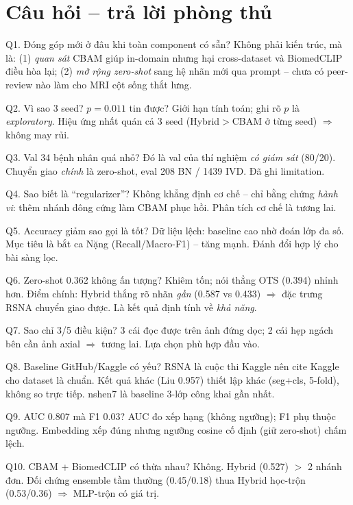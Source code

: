 \documentclass[12pt,a4paper]{article}
\begin{document}
\section{Câu hỏi -- trả lời phòng thủ}
\begin{qabox}{Q1. Đóng góp mới ở đâu khi toàn component có sẵn?}
Không phải kiến trúc, mà là: (1) \emph{quan sát} CBAM giúp in-domain nhưng hại cross-dataset và BiomedCLIP điều hòa lại; (2) \emph{mở rộng zero-shot} sang hệ nhãn mới qua prompt -- chưa có peer-review nào làm cho MRI cột sống thắt lưng.
\end{qabox}
\begin{qabox}{Q2. Vì sao 3 seed? $p=0.011$ tin được?}
Giới hạn tính toán; ghi rõ $p$ là \emph{exploratory}. Hiệu ứng nhất quán cả 3 seed (Hybrid$>$CBAM ở từng seed) $\Rightarrow$ không may rủi.
\end{qabox}
\begin{qabox}{Q3. Val 34 bệnh nhân quá nhỏ?}
Đó là val của thí nghiệm \emph{có giám sát} (80/20). Chuyển giao \emph{chính} là zero-shot, eval 208 BN / 1439 IVD. Đã ghi limitation.
\end{qabox}
\begin{qabox}{Q4. Sao biết là ``regularizer''?}
Không khẳng định cơ chế -- chỉ bằng chứng \emph{hành vi}: thêm nhánh đông cứng làm CBAM phục hồi. Phân tích cơ chế là tương lai.
\end{qabox}
\begin{qabox}{Q5. Accuracy giảm sao gọi là tốt?}
Dữ liệu lệch: baseline cao nhờ đoán lớp đa số. Mục tiêu là bắt ca Nặng (Recall/Macro-F1) -- tăng mạnh. Đánh đổi hợp lý cho bài sàng lọc.
\end{qabox}
\begin{qabox}{Q6. Zero-shot 0.362 không ấn tượng?}
Khiêm tốn; nói thẳng OTS (0.394) nhỉnh hơn. Điểm chính: Hybrid thắng rõ nhãn \emph{gần} (0.587 vs 0.433) $\Rightarrow$ đặc trưng RSNA chuyển giao được. Là kết quả định tính về \emph{khả năng}.
\end{qabox}
\begin{qabox}{Q7. Sao chỉ 3/5 điều kiện?}
3 cái đọc được trên ảnh đứng dọc; 2 cái hẹp ngách bên cần ảnh axial $\Rightarrow$ tương lai. Lựa chọn phù hợp đầu vào.
\end{qabox}
\begin{qabox}{Q8. Baseline GitHub/Kaggle có yếu?}
RSNA là cuộc thi Kaggle nên cite Kaggle cho dataset là chuẩn. Kết quả khác (Liu 0.957) thiết lập khác (seg+cls, 5-fold), không so trực tiếp. nshen7 là baseline 3-lớp công khai gần nhất.
\end{qabox}
\begin{qabox}{Q9. AUC 0.807 mà F1 0.03?}
AUC đo xếp hạng (không ngưỡng); F1 phụ thuộc ngưỡng. Embedding xếp đúng nhưng ngưỡng cosine cố định (giữ zero-shot) chấm lệch.
\end{qabox}
\begin{qabox}{Q10. CBAM + BiomedCLIP có thừa nhau?}
Không. Hybrid (0.527) $>$ 2 nhánh đơn. Đối chứng ensemble tầm thường (0.45/0.18) thua Hybrid học-trộn (0.53/0.36) $\Rightarrow$ MLP-trộn có giá trị.
\end{qabox}
\end{document}
